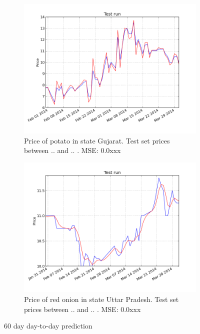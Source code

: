 \begin{figure}[!ht]
    \centering
        \begin{subfigure}[b]{.45\textwidth}
        \centering
        \includegraphics[width=\textwidth]{./img/plots/esn/daily/gujarat_potato_online_60d_1d.png}
        \caption{Price of potato in state Gujarat. Test set prices between .. and .. . MSE: 0.0xxx}
        \label{subfig:res_60d_1}
        \end{subfigure}
        \quad
        \begin{subfigure}[b]{.45\textwidth}
        \centering
        \includegraphics[width=\textwidth]{./img/plots/esn/daily/uttar_pradesh_redonion_60d_1d.png}
        \caption{Price of red onion in state Uttar Pradesh. Test set prices between .. and .. . MSE: 0.0xxx}
        \label{subfig:res_60d_2}
        \end{subfigure}

    \caption{60 day day-to-day prediction}   
    \label{fig:res_60d}
\end{figure}

